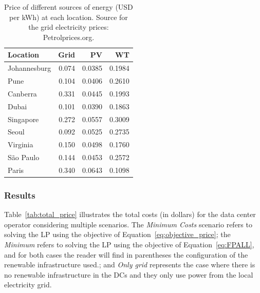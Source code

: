 \begin{table}[H]
  
  \caption{Price of different sources of energy (USD per kWh) at each location. Source for the grid electricity prices: Petrolprices.org.  }\label{tab:price_electricity_sources} \centering
  
  \begin{tabular}{|l|r|r|r|}
  \hline    
  \textbf{Location} &   \textbf{Grid} & \textbf{PV} & \textbf{WT} \\
  \hline
  Johannesburg & 0.074 & 0.0385 &  0.1984   \\
  \hline
  Pune      &  0.104   & 0.0406 & 0.2610    \\
  \hline
  Canberra  & 0.331    &  0.0445 & 0.1993   \\
  \hline
  Dubai   & 0.101      & 0.0390 &   0.1863  \\
  \hline
  Singapore & 0.272    & 0.0557 & 0.3009    \\
  \hline     
  Seoul      & 0.092   & 0.0525 & 0.2735    \\
  \hline
  Virginia   & 0.150   &  0.0498 &  0.1760  \\
  \hline
  São Paulo  & 0.144   &  0.0453 & 0.2572   \\
  \hline 
  Paris      & 0.340   &  0.0643 & 0.1098   \\
  \hline  

\end{tabular}
\end{table}

\subsubsection{Results}

Table~\ref{tab:total_price} illustrates the total costs (in dollars) for the data center operator considering multiple scenarios. The \textit{Minimum Costs} scenario refers to solving the LP using the objective of Equation~\eqref{eq:objective_price}; the \textit{Minimum } refers to solving the LP using the objective of Equation~\eqref{eq:FPALL}, and for both cases the reader will find in parentheses the configuration of the renewable infrastructure used.; and \textit{Only grid} represents the case where there is no renewable infrastructure in the DCs and they only use power from the local electricity grid.



